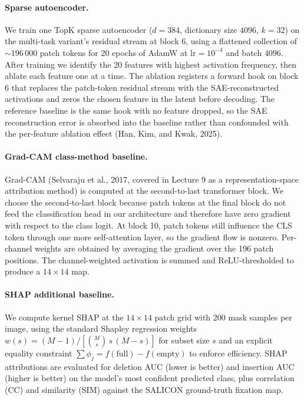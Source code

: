 \documentclass{article}
\begin{document}
\paragraph{Sparse autoencoder.}
We train one TopK sparse autoencoder ($d = 384$, dictionary size $4096$, $k = 32$) on the multi-task variant's residual stream at block 6, using a flattened collection of $\sim 196\,000$ patch tokens for 20 epochs of AdamW at $\text{lr} = 10^{-3}$ and batch $4096$. After training we identify the 20 features with highest activation frequency, then ablate each feature one at a time. The ablation registers a forward hook on block 6 that replaces the patch-token residual stream with the SAE-reconstructed activations and zeros the chosen feature in the latent before decoding. The reference baseline is the same hook with no feature dropped, so the SAE reconstruction error is absorbed into the baseline rather than confounded with the per-feature ablation effect (Han, Kim, and Kwak, 2025).

\paragraph{Grad-CAM class-method baseline.}
Grad-CAM (Selvaraju et al., 2017, covered in Lecture 9 as a representation-space attribution method) is computed at the second-to-last transformer block. We choose the second-to-last block because patch tokens at the final block do not feed the classification head in our architecture and therefore have zero gradient with respect to the class logit. At block 10, patch tokens still influence the CLS token through one more self-attention layer, so the gradient flow is nonzero. Per-channel weights are obtained by averaging the gradient over the 196 patch positions. The channel-weighted activation is summed and ReLU-thresholded to produce a $14 \times 14$ map.

\paragraph{SHAP additional baseline.}
We compute kernel SHAP at the $14 \times 14$ patch grid with 200 mask samples per image, using the standard Shapley regression weights $w(s) = (M-1) / [\binom{M}{s}\, s\, (M-s)]$ for subset size $s$ and an explicit equality constraint $\sum \phi_j = f(\text{full}) - f(\text{empty})$ to enforce efficiency. SHAP attributions are evaluated for deletion AUC (lower is better) and insertion AUC (higher is better) on the model's most confident predicted class, plus correlation (CC) and similarity (SIM) against the SALICON ground-truth fixation map.
\end{document}
